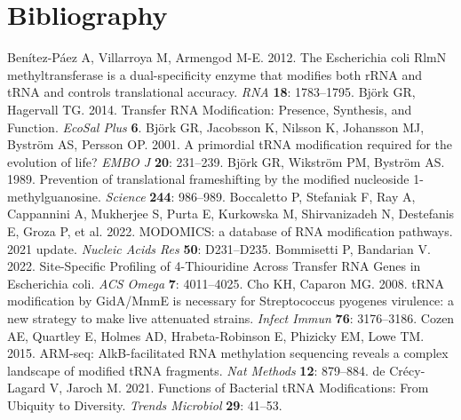 \documentclass[times, twoside]{zHenriquesLab-StyleBioRxiv}
\begin{document}
\section*{Bibliography}
Benítez-Páez A, Villarroya M, Armengod M-E. 2012. The Escherichia coli RlmN methyltransferase is a dual-specificity enzyme that modifies both rRNA and tRNA and controls translational accuracy. \textit{RNA} \textbf{18}: 1783–1795. 
\newline
\newline
Björk GR, Hagervall TG. 2014. Transfer RNA Modification: Presence, Synthesis, and Function. \textit{EcoSal Plus} \textbf{6}. 
\newline
\newline
Björk GR, Jacobsson K, Nilsson K, Johansson MJ, Byström AS, Persson OP. 2001. A primordial tRNA modification required for the evolution of life? \textit{EMBO J} \textbf{20}: 231–239. 
\newline
\newline
Björk GR, Wikström PM, Byström AS. 1989. Prevention of translational frameshifting by the modified nucleoside 1-methylguanosine. \textit{Science} \textbf{244}: 986–989. 
\newline
\newline
Boccaletto P, Stefaniak F, Ray A, Cappannini A, Mukherjee S, Purta E, Kurkowska M, Shirvanizadeh N, Destefanis E, Groza P, et al. 2022. MODOMICS: a database of RNA modification pathways. 2021 update. \textit{Nucleic Acids Res} \textbf{50}: D231–D235. 
\newline
\newline
Bommisetti P, Bandarian V. 2022. Site-Specific Profiling of 4-Thiouridine Across Transfer RNA Genes in Escherichia coli. \textit{ACS Omega} \textbf{7}: 4011–4025. 
\newline
\newline
Cho KH, Caparon MG. 2008. tRNA modification by GidA/MnmE is necessary for Streptococcus pyogenes virulence: a new strategy to make live attenuated strains. \textit{Infect Immun} \textbf{76}: 3176–3186. 
\newline
\newline
Cozen AE, Quartley E, Holmes AD, Hrabeta-Robinson E, Phizicky EM, Lowe TM. 2015. ARM-seq: AlkB-facilitated RNA methylation sequencing reveals a complex landscape of modified tRNA fragments. \textit{Nat Methods} \textbf{12}: 879–884. 
\newline
\newline
de Crécy-Lagard V, Jaroch M. 2021. Functions of Bacterial tRNA Modifications: From Ubiquity to Diversity. \textit{Trends Microbiol} \textbf{29}: 41–53. 
\end{document}
